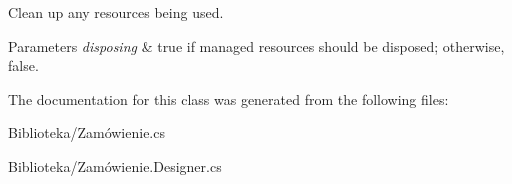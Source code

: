 Clean up any resources being used. 


\begin{DoxyParams}{Parameters}
{\em disposing} & true if managed resources should be disposed; otherwise, false.\\
\hline
\end{DoxyParams}


The documentation for this class was generated from the following files\+:\begin{DoxyCompactItemize}
\item 
Biblioteka/Zamówienie.\+cs\item 
Biblioteka/Zamówienie.\+Designer.\+cs\end{DoxyCompactItemize}
